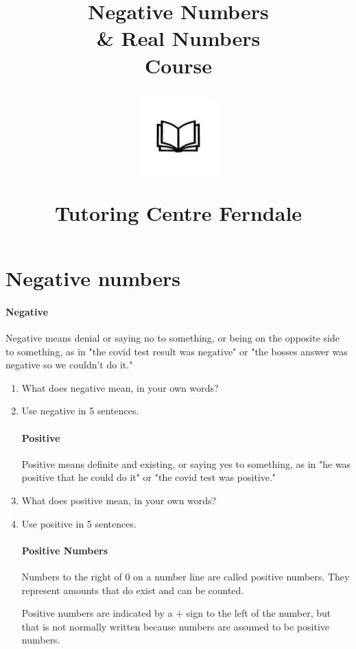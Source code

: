 \documentclass{article}
\title{Negative Numbers\\\& Real Numbers\\Course\\
\begin{center}
\includegraphics[width=4em]{ApS_logo.png}
\end{center}
\begin{normalsize}Tutoring Centre Ferndale \end{normalsize}}
\author{}
\date{}
\begin{document}
\maketitle

\section*{Negative numbers}

\paragraph{Negative}
Negative means denial or saying no to something, or being on the opposite side to something, as in "the covid test result was negative" or "the bosses answer was negative so we couldn't do it."

\begin{enumerate}

\item What does negative mean, in your own words?
\item Use negative in 5 sentences.

\paragraph{Positive}
Positive means definite and existing, or saying yes to something, as in "he was positive that he could do it" or "the covid test was positive."

\item What does positive mean, in your own words?
\item Use positive in 5 sentences.

\begin{center}
\end{center}

\paragraph{Positive Numbers}
Numbers to the right of 0 on a number line are called positive numbers. They represent amounts that do exist and can be counted.

Positive numbers are indicated by a $+$ sign to the left of the number, but that is not normally written because numbers are assumed to be positive numbers.


\end{enumerate}
\end{document}
